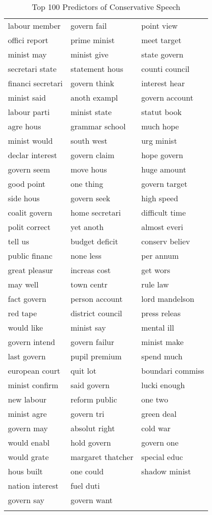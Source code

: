 \begingroup\scriptsize
\begin{longtable}{p{}p{}p{}}
\caption{Top 100 Predictors of Conservative Speech} \\ 
  \hline
  \hline
labour member & govern fail & point view \\ 
  offici report & prime minist & meet target \\ 
  minist may & minist give & state govern \\ 
  secretari state & statement hous & counti council \\ 
  financi secretari & govern think & interest hear \\ 
  minist said & anoth exampl & govern account \\ 
  labour parti & minist state & statut book \\ 
  agre hous & grammar school & much hope \\ 
  minist would & south west & urg minist \\ 
  declar interest & govern claim & hope govern \\ 
  govern seem & move hous & huge amount \\ 
  good point & one thing & govern target \\ 
  side hous & govern seek & high speed \\ 
  coalit govern & home secretari & difficult time \\ 
  polit correct & yet anoth & almost everi \\ 
  tell us & budget deficit & conserv believ \\ 
  public financ & none less & per annum \\ 
  great pleasur & increas cost & get wors \\ 
  may well & town centr & rule law \\ 
  fact govern & person account & lord mandelson \\ 
  red tape & district council & press releas \\ 
  would like & minist say & mental ill \\ 
  govern intend & govern failur & minist make \\ 
  last govern & pupil premium & spend much \\ 
  european court & quit lot & boundari commiss \\ 
  minist confirm & said govern & lucki enough \\ 
  new labour & reform public & one two \\ 
  minist agre & govern tri & green deal \\ 
  govern may & absolut right & cold war \\ 
  would enabl & hold govern & govern one \\ 
  would grate & margaret thatcher & special educ \\ 
  hous built & one could & shadow minist \\ 
  nation interest & fuel duti &  \\ 
  govern say & govern want &  \\ 
   \hline
\hline
\label{tab:top_100c}
\end{longtable}
\endgroup
